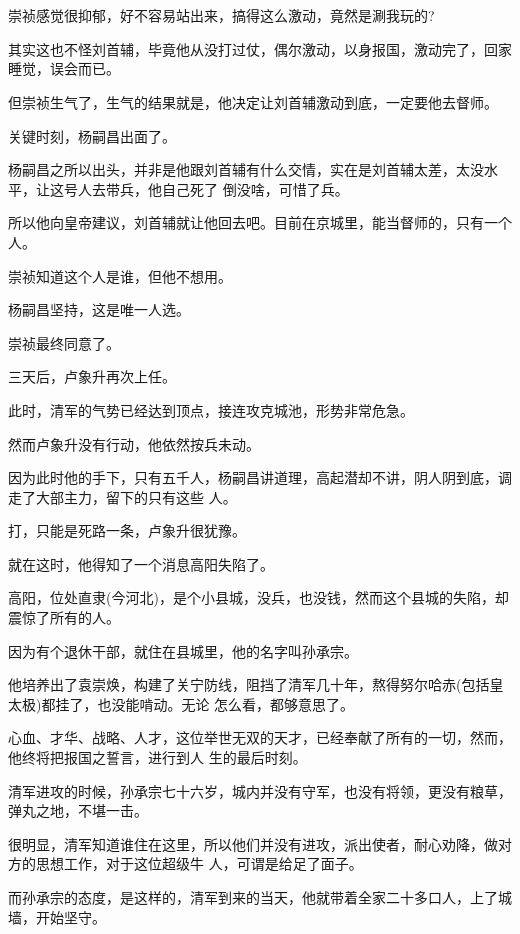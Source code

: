 \documentclass[11pt,a4paper,onecolumn]{article}
\begin{document}
\section[\thesection]{}

崇祯感觉很抑郁，好不容易站出来，搞得这么激动，竟然是涮我玩的?

其实这也不怪刘首辅，毕竟他从没打过仗，偶尔激动，以身报国，激动完了，回家睡觉，误会而已。

但崇祯生气了，生气的结果就是，他决定让刘首辅激动到底，一定要他去督师。

关键时刻，杨嗣昌出面了。

杨嗣昌之所以出头，并非是他跟刘首辅有什么交情，实在是刘首辅太差，太没水平，让这号人去带兵，他自己死了
倒没啥，可惜了兵。

所以他向皇帝建议，刘首辅就让他回去吧。目前在京城里，能当督师的，只有一个人。

崇祯知道这个人是谁，但他不想用。

杨嗣昌坚持，这是唯一人选。

崇祯最终同意了。

三天后，卢象升再次上任。

此时，清军的气势已经达到顶点，接连攻克城池，形势非常危急。

然而卢象升没有行动，他依然按兵未动。

因为此时他的手下，只有五千人，杨嗣昌讲道理，高起潜却不讲，阴人阴到底，调走了大部主力，留下的只有这些
人。

打，只能是死路一条，卢象升很犹豫。

就在这时，他得知了一个消息\myrule 高阳失陷了。

高阳，位处直隶(今河北)，是个小县城，没兵，也没钱，然而这个县城的失陷，却震惊了所有的人。

因为有个退休干部，就住在县城里，他的名字叫孙承宗。

他培养出了袁崇焕，构建了关宁防线，阻挡了清军几十年，熬得努尔哈赤(包括皇太极)都挂了，也没能啃动。无论
怎么看，都够意思了。

心血、才华、战略、人才，这位举世无双的天才，已经奉献了所有的一切，然而，他终将把报国之誓言，进行到人
生的最后时刻。

清军进攻的时候，孙承宗七十六岁，城内并没有守军，也没有将领，更没有粮草，弹丸之地，不堪一击。

很明显，清军知道谁住在这里，所以他们并没有进攻，派出使者，耐心劝降，做对方的思想工作，对于这位超级牛
人，可谓是给足了面子。

而孙承宗的态度，是这样的，清军到来的当天，他就带着全家二十多口人，上了城墙，开始坚守。
\end{document}
